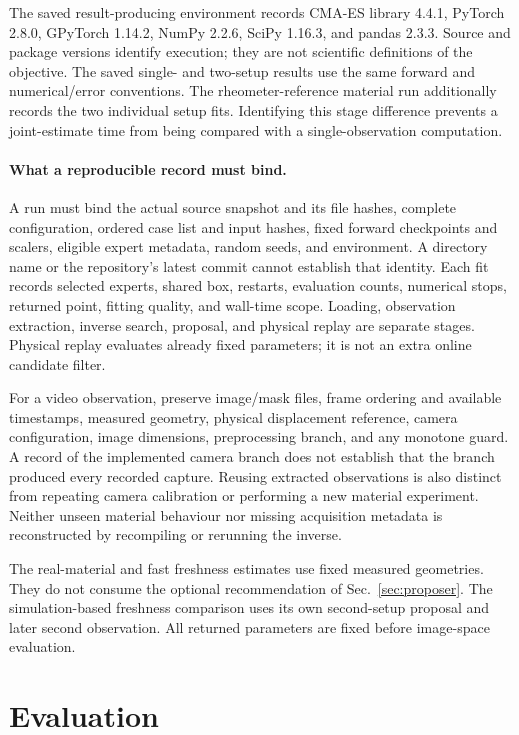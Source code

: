 The saved result-producing environment records CMA-ES library 4.4.1,
PyTorch 2.8.0, GPyTorch 1.14.2, NumPy 2.2.6, SciPy 1.16.3, and
pandas 2.3.3. Source and package versions identify execution;
they are not scientific definitions of the objective.
The saved single- and two-setup results use the same forward and
numerical/error conventions. The rheometer-reference material run
additionally records the two individual setup fits. Identifying this
stage difference prevents a joint-estimate time from being compared
with a single-observation computation.

\paragraph{What a reproducible record must bind.}
A run must bind the actual source snapshot and its file hashes,
complete configuration, ordered case list and input hashes, fixed
forward checkpoints and scalers, eligible expert metadata, random
seeds, and environment. A directory name or the repository's latest
commit cannot establish that identity. Each fit records selected
experts, shared box, restarts, evaluation counts, numerical stops,
returned point, fitting quality, and wall-time scope. Loading,
observation extraction, inverse search, proposal, and physical replay
are separate stages. Physical replay evaluates already fixed
parameters; it is not an extra online candidate filter.

For a video observation, preserve image/mask files, frame ordering
and available timestamps, measured geometry, physical displacement
reference, camera configuration, image dimensions, preprocessing
branch, and any monotone guard. A record of the implemented camera
branch does not establish that the branch produced every recorded
capture. Reusing extracted observations is also distinct from
repeating camera calibration or performing a new material experiment.
Neither unseen material behaviour nor missing acquisition metadata is
reconstructed by recompiling or rerunning the inverse.

The real-material and fast freshness estimates use fixed measured
geometries. They do not consume the optional recommendation of
Sec.~\ref{sec:proposer}. The simulation-based freshness comparison
uses its own second-setup proposal and later second observation.
All returned parameters are fixed before image-space evaluation.

\section{Evaluation}
\label{sec:results}

